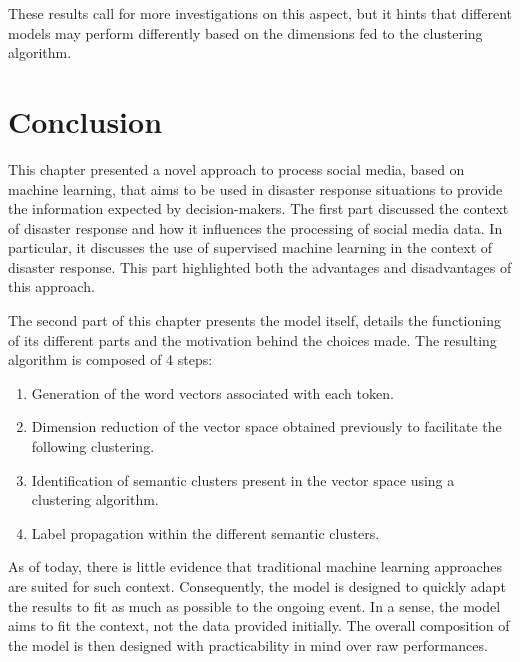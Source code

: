 These results call for more investigations on this aspect, but it hints that different models may perform differently based on the dimensions fed to the clustering algorithm.

\section*{Conclusion}
This chapter presented a novel approach to process social media, based on machine learning, that aims to be used in disaster response situations to provide the information expected by decision-makers.
The first part discussed the context of disaster response and how it influences the processing of social media data.
In particular, it discusses the use of supervised machine learning in the context of disaster response.
This part highlighted both the advantages and disadvantages of this approach.

The second part of this chapter presents the model itself, details the functioning of its different parts and the motivation behind the choices made.
The resulting algorithm is composed of 4 steps:

\begin{enumerate}
    \item Generation of the word vectors associated with each token.
    \item Dimension reduction of the vector space obtained previously to facilitate the following clustering.
    \item Identification of semantic clusters present in the vector space using a clustering algorithm.
    \item Label propagation within the different semantic clusters.
\end{enumerate}

As of today, there is little evidence that traditional machine learning approaches are suited for such context.
Consequently, the model is designed to quickly adapt the results to fit as much as possible to the ongoing event.
In a sense, the model aims to fit the context, not the data provided initially.
The overall composition of the model is then designed with practicability in mind over raw performances.


